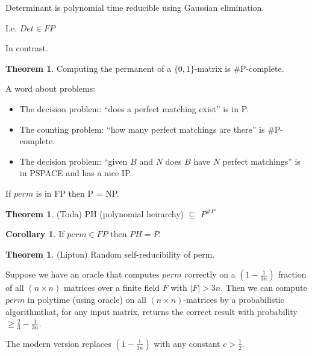 \documentclass[a4paper,12pt]{article}
\theoremstyle{definition}
\newtheorem{theorem}[counter]{Theorem}
\newtheorem{corollary}[counter]{Corollary}
\theoremstyle{remark}
\begin{document}
Determinant is polynomial time reducible using Gaussian elimination.

I.e. $Det \in FP$

In contrast.

\begin{theorem}
    Computing the permanent of a $\{0, 1\}$-matrix is $\#$P-complete.
\end{theorem}

A word about problems:
\begin{itemize}
    \item The decision problem: ``does a perfect matching exist'' is in P.
    \item The counting problem: ``how many perfect matchings are there'' is $\#$P-complete.
    \item The decision problem: ``given $B$ and $N$ does $B$ have $N$ perfect matchings'' is in PSPACE and has a nice IP.
\end{itemize}

If $perm$ is in FP then P = NP.

\begin{theorem}
    (Toda)
    PH (polynomial heirarchy) $\subseteq$ $P^{\#P}$
\end{theorem}

\begin{corollary}
    If $perm \in FP$ then $PH = P$.
\end{corollary}

\begin{theorem}
    (Lipton)
    Random self-reducibility of perm.

    Suppose we have an oracle that computes $perm$ correctly on a $(1 - \frac{1}{3n})$ 
    fraction of all $(n \times n)$ matrices over a finite field $F$ with $|F| > 3n$.
    Then we can compute $perm$ in polytime (using oracle) on all $(n \times n)$-matrices 
    by a probabilistic algorithmthat, for any input matrix, returns the correct result with 
    probability $\geq \frac{2}{3} - \frac{1}{3n}$.
\end{theorem}

The modern version replaces $(1 - \frac{1}{3n})$  with any constant $c > \frac{1}{2}$.
\end{document}

